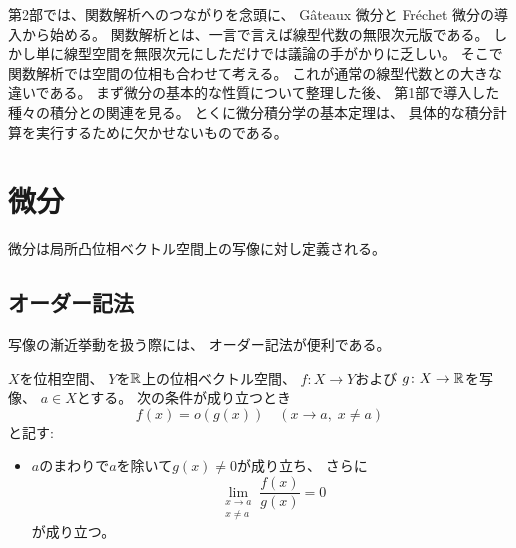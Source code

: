\documentclass[report]{jlreq}
\begin{document}
第2部では、関数解析へのつながりを念頭に、
G\^ateaux 微分と Fr\'echet 微分の導入から始める。
関数解析とは、一言で言えば線型代数の無限次元版である\cite{河東_1522262179753645952}。
しかし単に線型空間を無限次元にしただけでは議論の手がかりに乏しい。
そこで関数解析では空間の位相も合わせて考える。
これが通常の線型代数との大きな違いである。
まず微分の基本的な性質について整理した後、
第1部で導入した種々の積分との関連を見る。
とくに微分積分学の基本定理は、
具体的な積分計算を実行するために欠かせないものである。

%
\chapter{微分}

微分は局所凸位相ベクトル空間上の写像に対し定義される。

%
\section{オーダー記法}

写像の漸近挙動を扱う際には、
オーダー記法が便利である。

\begin{definition}[Little-o 記法]
    $X$を位相空間、
    $Y$を$\mathbb{R}$上の位相ベクトル空間、
    $f \colon X \to Y$および
    $g \colon X \to \mathbb{R}$を写像、
    $a \in X$とする。
    次の条件が成り立つとき
    \begin{equation}
        f(x) = o(g(x)) \quad (x \to a, \; x \neq a)
    \end{equation}
    と記す:
    \begin{itemize}
        \item $a$のまわりで$a$を除いて$g(x) \neq 0$が成り立ち、
            さらに
            \begin{equation}
                \lim_{\substack{x \to a \\ x \neq a}} \frac{f(x)}{g(x)} = 0
            \end{equation}
            が成り立つ。
    \end{itemize}
\end{definition}
\end{document}
